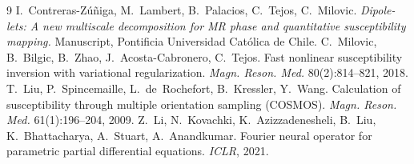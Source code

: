 \documentclass[11pt]{article}
\begin{document}
\begin{thebibliography}{9}
 I.~Contreras-Z\'u\~niga, M.~Lambert, B.~Palacios, C.~Tejos, C.~Milovic. \emph{Dipole-lets: A new multiscale decomposition for MR phase and quantitative susceptibility mapping.} Manuscript, Pontificia Universidad Cat\'olica de Chile.
 C.~Milovic, B.~Bilgic, B.~Zhao, J.~Acosta-Cabronero, C.~Tejos. Fast nonlinear susceptibility inversion with variational regularization. \emph{Magn. Reson. Med.} 80(2):814--821, 2018.
 T.~Liu, P.~Spincemaille, L.~de~Rochefort, B.~Kressler, Y.~Wang. Calculation of susceptibility through multiple orientation sampling (COSMOS). \emph{Magn. Reson. Med.} 61(1):196--204, 2009.
 Z.~Li, N.~Kovachki, K.~Azizzadenesheli, B.~Liu, K.~Bhattacharya, A.~Stuart, A.~Anandkumar. Fourier neural operator for parametric partial differential equations. \emph{ICLR}, 2021.
\end{thebibliography}
\end{document}
